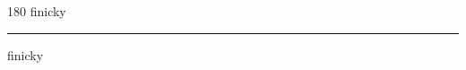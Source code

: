 
\begin{frame}
\begin{center}
\begin{turn}{180}
{\fontsize{2.5cm}{1em}\selectfont finicky}
\end{turn}
\vspace{1em}\par  
\hrule
\vspace{1em}\par  
{\fontsize{2.5cm}{1em}\selectfont finicky}
\end{center}
\end{frame}
